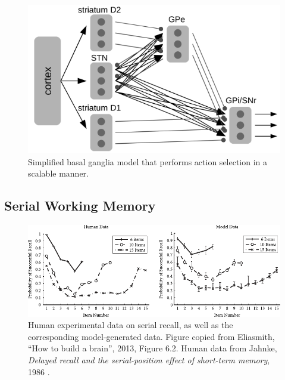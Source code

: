 \documentclass[10pt,letterpaper,oneside]{article}
\begin{document}
\begin{figure}[t]
	\centering
	\includegraphics[scale=1]{media/gpr3.png}
	\caption{Simplified basal ganglia model that performs action selection in a scalable manner.}
	\label{fig:simple_bg}
\end{figure}

\subsection{Serial Working Memory}

\begin{figure}[t]
	\centering
	\includegraphics[scale=1.2]{media/htbab_ose_experiment.pdf}
	\caption{Human experimental data on serial recall, as well as the corresponding model-generated data. Figure copied from Eliasmith, \enquote{How to build a brain}, 2013, Figure 6.2. Human data from Jahnke, \emph{Delayed recall and the serial-position effect of short-term memory}, 1986 \cite{jahnke1968delayed}.}
	\label{fig:htbab_ose_experiment}
\end{figure}
\end{document}

